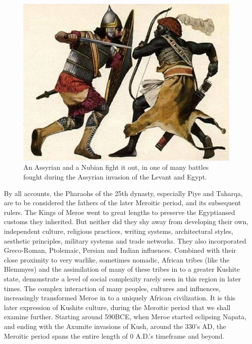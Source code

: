 \documentclass[a4paper,12pt]{scrreprt}
\begin{document}
\begin{figure}[H]
	\centering
	\includegraphics[width=\textwidth]{img/assyrian_vs_nubian}
	\caption{An Assyrian and a Nubian fight it out, in one of many battles fought during the Assyrian invasion of the Levant and Egypt.}
\end{figure}

By all accounts, the Pharaohs of the 25th dynasty, especially Piye and Taharqa, are to be considered the fathers of the later Meroitic period, and its subsequent rulers. The Kings of Meroe went to great lengths to preserve the Egyptiansed customs they inherited. But neither did they shy away from developing their own, independent culture, religious practices, writing systems, architectural styles, aesthetic principles, military systems and trade networks. They also incorporated Greco-Roman, Ptolemaic, Persian and Indian influences. Combined with their close proximity to very warlike, sometimes nomadic, African tribes (like the Blemmyes) and the assimilation of many of these tribes in to a greater Kushite state, demonstrate a level of social complexity rarely seen in this region in later times. The complex interaction of many peoples, cultures and influences, increasingly transformed Meroe in to a uniquely African civilization. It is this later expression of Kushite culture, during the Meroitic period that we shall examine further. Starting around 590BCE, when Meroe started eclipsing Napata, and ending with the Axumite invasions of Kush, around the 330's AD, the Meroitic period spans the entire length of 0 A.D.’s timeframe and beyond.
\end{document}
